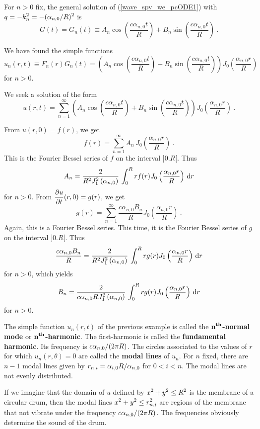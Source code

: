\begin{egg}
For $n>0$ fix, the general solution of (\ref{wave_spv_we_pcODE1})
with $\displaystyle q=-k_n^2 = -(\alpha_{n,0}/R)^2$ is
\[
G(t) = G_n(t) \equiv A_n \cos\left(\frac{c \alpha_{n,0} t}{R}\right)
+ B_n \sin\left(\frac{c \alpha_{n,0} t}{R}\right) \ .
\]

We have found the simple functions
\[
u_n(r,t) \equiv
F_n(r)G_n(t) = \left(A_n \cos\left(\frac{c \alpha_{n,0} t}{R}\right)
+ B_n \sin\left(\frac{c \alpha_{n,0} t}{R}\right)\right)
J_0\left(\frac{\alpha_{n,0}r}{R}\right)
\]
for $n > 0$.

We seek a solution of the form
\[
u(r,t) = \sum_{n=1}^\infty \left(A_n \cos\left(\frac{c \alpha_{n,0} t}{R}\right)
+ B_n \sin\left(\frac{c \alpha_{n,0} t}{R}\right)\right)
J_0\left(\frac{\alpha_{n,0}r}{R}\right) \ .
\]

From $u(r,0) = f(r)$, we get
\[
f(r) = \sum_{n=1}^\infty A_n \, J_0\left(\frac{\alpha_{n,0}r}{R}\right) \ .
\]
This is the Fourier Bessel series of $f$ on the interval $]0.R[$.
Thus
\[
A_n = \frac{2}{R^2 J_1^2\left(\alpha_{n,0}\right)} \,
\int_0^R r f(r) J_0\left(\frac{\alpha_{n,0} r}{R}\right) \,\mathrm{d}{r}
\]
for $n>0$.  From $\displaystyle \frac{\partial{u}}{\partial t}(r,0) = g(r)$, we get
\[
g(r) = \sum_{n=1}^\infty \frac{c \alpha_{n,0} B_n}{R}
J_0\left(\frac{\alpha_{n,0}r}{R}\right) \  .
\]
Again, this is a Fourier Bessel series.  This time, it is the Fourier
Bessel series of $g$ on the interval $]0.R[$.  Thus
\[
\frac{c \alpha_{n,0} B_n}{R} = \frac{2}{R^2 J_1^2\left(\alpha_{n,0}\right)} \,
\int_0^R r g(r) J_0\left(\frac{\alpha_{n,0} r}{R}\right) \,\mathrm{d}{r}
\]
for $n > 0$, which yields
\[
B_n = \frac{2}{c \alpha_{n,0} R J_1^2\left(\alpha_{n,0}\right)} \,
\int_0^R r g(r) J_0\left(\frac{\alpha_{n,0} r}{R}\right) \,\mathrm{d}{r}
\]
for $n > 0$.
\end{egg}

\begin{rmk}
The simple function $u_n(r,t)$ of the previous example is called the
{\bfseries $\displaystyle \mathbf{n^{th}}$-normal
mode} or {\bfseries $\displaystyle \mathbf{n^{th}}$-harmonic}.
The first-harmonic is called the
{\bfseries fundamental harmonic}.
Its frequency is $\displaystyle c\alpha_{n,0}/(2\pi R)$.
The circles associated to the values of $r$ for which
$u_n(r,\theta)=0$ are called the
{\bfseries modal lines} of $u_n$.
For $n$ fixed, there are $n-1$ modal lines given by
$\displaystyle r_{n,i} = \alpha_{i,0}R/\alpha_{n,0}$
for $0<i<n$.  The modal lines are not evenly distributed.

If we imagine that the domain of $u$ defined by
$\displaystyle x^2 + y^2 \leq R^2$ is the membrane of a circular drum,
then the modal lines $\displaystyle x^2 + y^2 \leq r_{n,i}^2$ are
regions of the membrane that not
vibrate under the frequency $\displaystyle c\alpha_{n,0}/(2 \pi R)$.
The frequencies obviously determine the sound of the drum.
\end{rmk}

